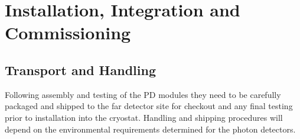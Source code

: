 \section{Installation, Integration and Commissioning}
\label{sec:fdsp-pd-install}


\subsection{Transport and Handling}
\label{sec:fdsp-pd-install-transport}

Following assembly and testing of the PD modules they need to be carefully packaged and shipped to the far detector site for checkout and any final testing prior to installation into the cryostat. Handling and shipping procedures will depend on the environmental requirements determined for the photon detectors.

